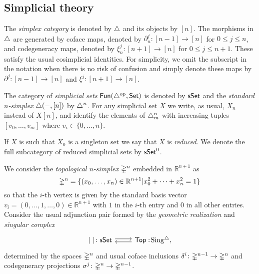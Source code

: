 \subsection{Simplicial theory}\label{ss:simplicial}

The \textit{simplex category} is denoted by $\triangle$ and its objects by $[n]$.
The morphisms in $\triangle$ are generated by coface maps, denoted by $\partial^{j}_n \colon [n-1] \to [n]$ for $0\leq j \leq n$, and codegeneracy maps, denoted by $\xi^{j}_n \colon [n+1] \to [n]$ for $0 \leq j \leq n+1$.
These satisfy the usual cosimplicial identities.
For simplicity, we omit the subscript in the notation when there is no risk of confusion and simply denote these maps by $\partial^{j} \colon [n-1] \to [n]$ and $\xi^{j} \colon [n+1] \to [n]$.

The category of \textit{simplicial sets} $\mathsf{Fun}(\triangle^{\mathrm{op}}, \mathsf{Set})$ is denoted by $\mathsf{sSet}$ and the \textit{standard $n$-simplex} $\triangle(-, [n])$ by $\triangle^n$.
For any simplicial set $X$ we write, as usual, $X_n$ instead of $X[n]$, and identify the elements of $\triangle^n_m$ with increasing tuples $[v_0, \dots, v_m]$ where $v_i \in \{0, \dots, n\}$.

If $X$ is such that $X_0$ is a singleton set we say that $X$ is \textit{reduced}.
We denote the full subcategory of reduced simplicial sets by $\mathsf{sSet}^0$.

We consider the \textit{topological $n$-simplex} $\mathbb{\Delta}^n$ embedded in $\mathbb{R}^{n+1}$ as
\[ \mathbb{\Delta}^n = \{ (x_0, \dots, x_n) \in \mathbb{R}^{n+1} | x_0^2 + \dots + x_n^2=1\} \]
so that the $i$-th vertex is given by the standard basis vector $v_i=(0,\ldots,1, \ldots,0) \in \mathbb{R}^{n+1}$ with $1$ in the $i$-th entry and $0$ in all other entries.
Consider the usual adjunction pair formed by the \textit{geometric realization} and \textit{singular complex}
\[
\begin{tikzcd}
	\bars{\ } \colon \sSet \arrow[r, shift left=.5ex] &
	\Top :\! \sSing, \arrow[l, shift left=.5ex]
\end{tikzcd}
\]
determined by the spaces $\mathbb{\Delta}^n$ and usual coface inclusions $\delta^i \colon \mathbb{\Delta}^{n-1} \to \mathbb{\Delta}^n$ and codegeneracy projections $\sigma^j \colon \mathbb{\Delta}^n \to \mathbb{\Delta}^{n-1}$.

